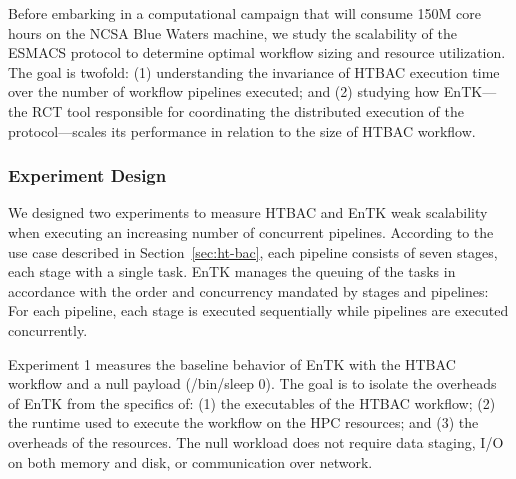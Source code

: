 
Before embarking in a computational campaign that will consume 150M core
hours on the NCSA Blue Waters machine, we study the scalability of the ESMACS
protocol to determine optimal workflow sizing and resource utilization. The
goal is twofold: (1) understanding the invariance of HTBAC execution time
over the number of workflow pipelines executed; and (2) studying how
EnTK---the RCT tool responsible for coordinating the distributed execution of
the protocol---scales its performance in relation to the size of HTBAC
workflow.

\subsubsection{Experiment Design}\label{ssec:exp_design}

We designed two experiments to measure HTBAC and EnTK weak scalability when
executing an increasing number of concurrent pipelines. According to the use
case described in Section~\ref{sec:ht-bac}, each pipeline consists of seven
stages, each stage with a single task. EnTK manages the queuing of the tasks
in accordance with the order and concurrency mandated by stages and
pipelines: For each pipeline, each stage is executed sequentially while
pipelines are executed concurrently.



Experiment 1 measures the baseline behavior of EnTK with the HTBAC workflow
and a null payload (\textmd{/bin/sleep 0}). The goal is to isolate the
overheads of EnTK from the specifics of: (1) the executables of the HTBAC
workflow; (2) the runtime used to execute the workflow on the HPC resources;
and (3) the overheads of the resources. The null workload does not require
data staging, I/O on both memory and disk, or communication over network.

